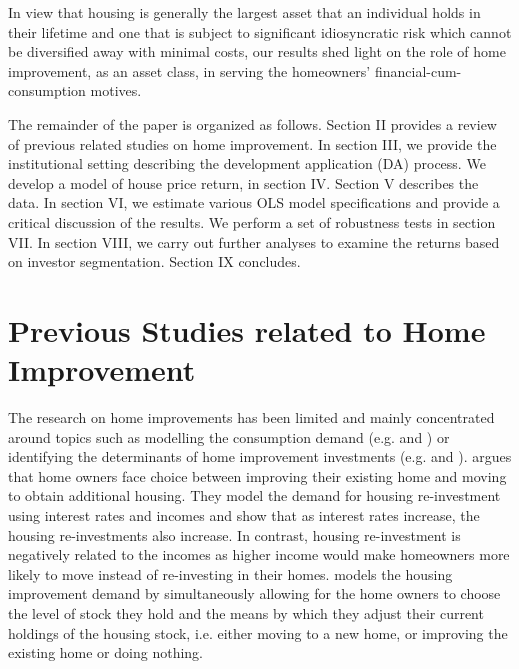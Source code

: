 \documentclass[AEJ,reqno, draftmode]{AEA} %
\begin{document}
In view that housing is generally the largest asset that an individual holds in their lifetime and one that is subject to significant idiosyncratic risk which cannot be diversified away with minimal costs, our results shed light on the role of home improvement, as an asset class, in serving the homeowners' financial-cum-consumption motives.

The remainder of the paper is organized as follows. Section II provides a review of previous related studies on home improvement. In section III, we provide the institutional setting describing the development application (DA) process. We develop a model of house price return, in section IV. Section V describes the data. In section VI, we estimate various OLS model specifications and provide a critical discussion of the results. We perform a set of robustness tests in section VII. In section VIII, we carry out further analyses to examine the returns based on investor segmentation. Section IX concludes.



\section{Previous Studies related to Home Improvement}

The research on home improvements has been limited and mainly concentrated around topics such as modelling the consumption demand (e.g. \citet{potepan1989interest} and \citet{montgomery1992explaining}) or identifying the determinants of home improvement investments (e.g. \citet{boehm1986improvement} and \citet{galster1987homeowners}). \citet{potepan1989interest} argues that home owners face choice between improving their existing home and moving to obtain additional housing. They model the demand for housing re-investment using interest rates and incomes and show that as interest rates increase, the housing re-investments also increase. In contrast, housing re-investment is negatively related to the incomes as higher income would make homeowners more likely to move instead of re-investing in their homes. \citet{montgomery1992explaining} models the housing improvement demand by simultaneously allowing for the home owners to choose the level of stock they hold and the means by which they adjust their current holdings of the housing stock, i.e. either moving to a new home, or improving the existing home or doing nothing. 
\end{document}
